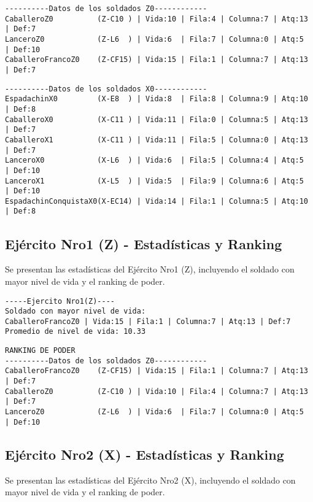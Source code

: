 \begin{lstlisting}[language=plaintext]
----------Datos de los soldados Z0------------
CaballeroZ0          (Z-C10 ) | Vida:10 | Fila:4 | Columna:7 | Atq:13 | Def:7
LanceroZ0            (Z-L6  ) | Vida:6  | Fila:7 | Columna:0 | Atq:5  | Def:10
CaballeroFrancoZ0    (Z-CF15) | Vida:15 | Fila:1 | Columna:7 | Atq:13 | Def:7
\end{lstlisting}

\begin{lstlisting}[language=plaintext]
----------Datos de los soldados X0------------
EspadachinX0         (X-E8  ) | Vida:8  | Fila:8 | Columna:9 | Atq:10 | Def:8
CaballeroX0          (X-C11 ) | Vida:11 | Fila:0 | Columna:5 | Atq:13 | Def:7
CaballeroX1          (X-C11 ) | Vida:11 | Fila:5 | Columna:0 | Atq:13 | Def:7
LanceroX0            (X-L6  ) | Vida:6  | Fila:5 | Columna:4 | Atq:5  | Def:10
LanceroX1            (X-L5  ) | Vida:5  | Fila:9 | Columna:6 | Atq:5  | Def:10
EspadachinConquistaX0(X-EC14) | Vida:14 | Fila:1 | Columna:5 | Atq:10 | Def:8
\end{lstlisting}

\subsection{Ejército Nro1 (Z) - Estadísticas y Ranking}
Se presentan las estadísticas del Ejército Nro1 (Z), incluyendo el soldado con mayor nivel de vida y el ranking de poder.

\begin{lstlisting}[language=plaintext]
-----Ejercito Nro1(Z)----
Soldado con mayor nivel de vida:
CaballeroFrancoZ0 | Vida:15 | Fila:1 | Columna:7 | Atq:13 | Def:7
Promedio de nivel de vida: 10.33
\end{lstlisting}

\begin{lstlisting}[language=plaintext]
RANKING DE PODER
----------Datos de los soldados Z0------------
CaballeroFrancoZ0    (Z-CF15) | Vida:15 | Fila:1 | Columna:7 | Atq:13 | Def:7
CaballeroZ0          (Z-C10 ) | Vida:10 | Fila:4 | Columna:7 | Atq:13 | Def:7
LanceroZ0            (Z-L6  ) | Vida:6  | Fila:7 | Columna:0 | Atq:5  | Def:10
\end{lstlisting}

\subsection{Ejército Nro2 (X) - Estadísticas y Ranking}
Se presentan las estadísticas del Ejército Nro2 (X), incluyendo el soldado con mayor nivel de vida y el ranking de poder.

